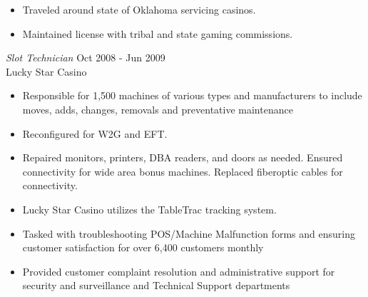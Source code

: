 \documentclass[margin]{res}
\begin{document}
\begin{resume}
\begin{itemize}
 		\item Traveled around state of Oklahoma servicing casinos.
 		\item Maintained license with tribal and state gaming commissions.
 	\end{itemize} 	
 	 	{\sl Slot Technician} \hfill Oct 2008 - Jun 2009 \\
 	Lucky Star Casino
 	\begin{itemize}  \itemsep -2pt %
 		\item Responsible for 1,500 machines of various types and manufacturers to include moves, adds, changes, removals and preventative maintenance 
 		\item Reconfigured for W2G and EFT. 
 		\item Repaired monitors, printers, DBA readers, and doors as needed. Ensured connectivity for wide area bonus machines. Replaced fiberoptic cables for connectivity.  
 		\item Lucky Star Casino utilizes the TableTrac tracking system.
 		\item Tasked with troubleshooting POS/Machine Malfunction forms and ensuring customer satisfaction for over 6,400 customers monthly
 		\item Provided customer complaint resolution and administrative support for security and surveillance and Technical Support departments
 	\end{itemize} 	
 	
\end{resume}
\end{document}

